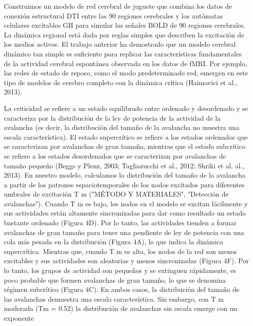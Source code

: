 Construimos un modelo de red cerebral de juguete que combina los datos de conexión estructural DTI entre las 90 regiones cerebrales y los autómatas celulares excitables GH para simular las señales BOLD de 90 regiones cerebrales. La dinámica regional está dada por reglas simples que describen la excitación de los medios activos. El trabajo anterior ha demostrado que un modelo cerebral dinámico tan simple es suficiente para replicar las características fundamentales de la actividad cerebral espontánea observada en los datos de fMRI. Por ejemplo, las redes de estado de reposo, como el modo predeterminado
red, emergen en este tipo de modelos de cerebro completo con la dinámica crítica (Haimovici et al., 2013).

La criticidad se refiere a un estado equilibrado entre ordenado y desordenado y se caracteriza por la distribución de la ley de potencia de la actividad de la avalancha (es decir, la distribución del tamaño de la avalancha no muestra una escala característica). El estado supercrítico se refiere a los estados ordenados que se caracterizan por avalanchas de gran tamaño, mientras que el estado subcrítico se refiere a los estados desordenados que se caracterizan por avalanchas de tamaño pequeño (Beggs y Plenz, 2003; Tagliazucchi et al., 2012; Shriki et al. al., 2013). En nuestro modelo, calculamos la distribución del tamaño de la avalancha a partir de los patrones espaciotemporales de los nodos excitados para diferentes umbrales de excitación T m ("MÉTODO Y MATERIALES", "Detección de avalanchas"). Cuando T m es bajo, los nodos en el modelo se excitan fácilmente y sus actividades están altamente sincronizadas para dar como resultado un estado bastante ordenado (Figura 4D). Por lo tanto, las actividades tienden a formar avalanchas de gran tamaño para tener una pendiente de ley de potencia con una cola más pesada en la distribución (Figura 4A), lo que indica la dinámica supercrítica. Mientras que, cuando T m es alta, los nodos de la red son menos excitables y sus actividades son aleatorias y menos sincronizadas (Figura 4F). Por lo tanto, los grupos de actividad son pequeños y se extinguen rápidamente, es poco probable que formen avalanchas de gran tamaño, lo que se denomina régimen subcrítico (Figura 4C). En ambos casos, la distribución del tamaño de las avalanchas demuestra una escala característica. Sin embargo, con T m moderada (Tm = 0.52) la distribución de avalanchas sin escala emerge con un exponente







